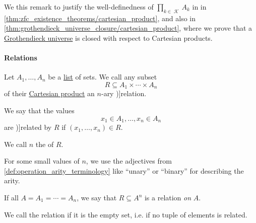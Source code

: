 \begin{comments}
\begin{comments}
  \item We this remark to justify the well-definedness of \( \prod_{k \in \mscrK} A_k \) in  in \cref{thm:zfc_existence_theorems/cartesian_product}, and also in \cref{thm:grothendieck_universe_closure/cartesian_product}, where we prove that a \hyperref[def:grothendieck_universe]{Grothendieck universe} is closed with respect to Cartesian products.
\end{comments}

\paragraph{Relations}

\begin{definition}\label{def:relation}
  Let \( A_1, \ldots, A_n \) be a \hyperref[def:ordered_tuple]{list} of sets. We call any subset
  \begin{equation*}
    R \subseteq A_1 \times \cdots \times A_n
  \end{equation*}
  of their \hyperref[def:cartesian_product]{Cartesian product} an \( n \)-ary \term[ru=\( n \)-местное отношение (\cite[90]{Герасимов2014Вычислимость})]{relation}.

  We say that the values
  \begin{equation*}
    x_1 \in A_1, \ldots, x_n \in A_n
  \end{equation*}
  are \term[en=related by \( R \) (\cite[6]{Aluffi2009Algebra})]{related} by \( R \) if \( (x_1, \ldots, x_n) \in R \).

  \begin{thmenum}[series=def:relation]
    \mimprovised We call \( n \) the  of \( R \).

    For some small values of \( n \), we use the adjectives from \cref{def:operation_arity_terminology} like \enquote{unary} or \enquote{binary} for describing the arity.

    \mimprovised If all \( A = A_1 = \cdots = A_n \), we say that \( R \subseteq A^n \) is a relation \emph{on} \( A \).

     We call the relation  if it is the empty set, i.e. if no tuple of elements is related.

    \medskip


\end{thmenum}
\end{definition}
\end{comments}
